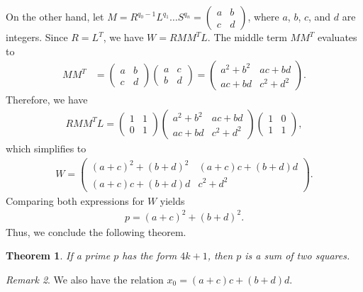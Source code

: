 \documentclass[12pt]{article}
\theoremstyle{plain}
\newtheorem{theorem}{Theorem}
\theoremstyle{definition}
\theoremstyle{remark}
\newtheorem{remark}[theorem]{Remark}
\begin{document}
On the other hand, let $ M = R^{q_0 - 1} L^{q_1} \ldots S^{q_n} = \begin{pmatrix} a & b \\ c & d \end{pmatrix} $, where $ a $, $ b $, $ c $, and $ d $ are integers. Since $ R = L^T $, we have $ W = RMM^TL $. The middle term $ MM^T $ evaluates to 
\begin{align*}
	MM^T &= \begin{pmatrix} a & b \\ c & d \end{pmatrix} \begin{pmatrix} a & c \\ b & d \end{pmatrix} = \begin{pmatrix} a^2 + b^2 & ac + bd \\ ac + bd & c^2 + d^2 \end{pmatrix}.
\end{align*}
Therefore, we have
\begin{align*}
	RMM^TL = \begin{pmatrix} 1 & 1 \\ 0 & 1 \end{pmatrix} \begin{pmatrix} a^2 + b^2 & ac + bd \\ ac + bd & c^2 + d^2 \end{pmatrix} \begin{pmatrix} 1 & 0 \\ 1 & 1 \end{pmatrix},
\end{align*}
which simplifies to 
\begin{align*}
	W = \begin{pmatrix} (a + c)^2 + (b + d)^2 & (a + c)c + (b + d)d \\ (a + c)c + (b + d)d & c^2 + d^2 \end{pmatrix}.
\end{align*}
Comparing both expressions for $ W $ yields
\begin{align*}
	p = (a + c)^2 + (b + d)^2.
\end{align*}
Thus, we conclude the following theorem.
\begin{theorem}
	If a prime $ p $ has the form $ 4k + 1 $, then $ p $ is a sum of two squares. 
\end{theorem}

\begin{remark}
	We also have the relation $ x_0 = (a + c)c + (b + d)d $.  
\end{remark}
\end{document}
